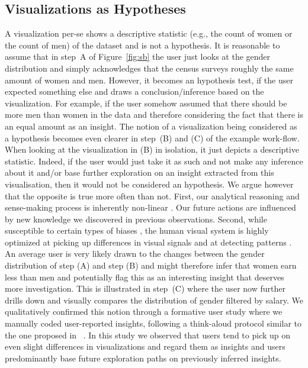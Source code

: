 \subsection{Visualizations as Hypotheses}
A visualization per-se shows a descriptive statistic (e.g., the count of women or the count of men) of the dataset and is not a hypothesis. 
It is reasonable to assume that in step~A of Figure~\ref{fig:sb} the user just looks at the gender distribution and simply acknowledges that the census surveys roughly the same amount of women and men.
However, it becomes an hypothesis test, if the user expected something else and draws a conclusion/inference based on the visualization. 
For example, if the user somehow assumed that there should be more men than women in the data and therefore considering the fact that there is an equal amount as an insight.
The notion of a visualization being considered as a hypothesis becomes even clearer in step~(B) and (C) of the example work-flow.
When looking at the visualization in (B) in isolation, it just depicts a descriptive statistic. 
Indeed, if the user would just take it as such and not make any inference about it and/or base further exploration on an insight extracted from this visualisation, then it would not be considered an hypothesis.
We argue however that the opposite is true more often than not. First, our analytical reasoning and sense-making process is inherently non-linear \cite{pirolli2005sensemaking,shrinivasan2008supporting}.
Our future actions are influenced by new knowledge we discovered in previous observations.
Second, while susceptible to certain types of biases \cite{attractionBias}, the human visual system is highly optimized at picking up differences in visual signals and at detecting patterns \cite{burgess1981efficiency}. 
An average user is very likely drawn to the changes between the gender distribution of step (A) and step (B) and might therefore infer that women earn less than men and potentially flag this as an interesting insight that deserves more investigation.
This is illustrated in step~(C) where the user now further drills down and visually compares the distribution of gender filtered by salary. 
We qualitatively confirmed this notion through a formative user study where we manually coded user-reported insights, following a think-aloud protocol similar to the one proposed in ~\cite{guo2016case}. In this study we observed that users tend to pick up on even slight differences in visualizations and regard them as insights and users predominantly base future exploration paths on previously inferred insights. 

